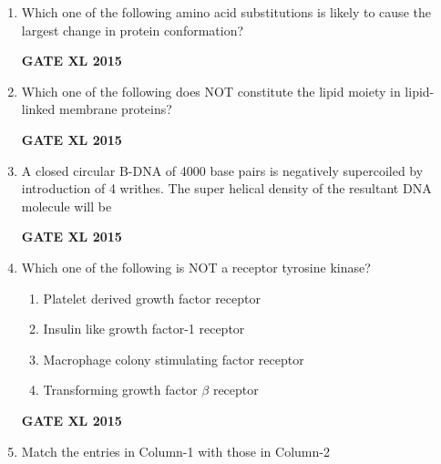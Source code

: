 \documentclass[journal,12pt,onecolumn]{IEEEtran}
\begin{document}
\begin{enumerate}
\begin{enumerate}
\begin{multicols}{4}
		    \end{multicols}
    \end{enumerate}
\begin{flushright}\textbf{GATE XL 2015}\end{flushright}
\item Which one of the following amino acid substitutions is likely to cause the largest change in protein conformation?
    \begin{enumerate}
    \end{enumerate}
\begin{flushright}\textbf{GATE XL 2015}\end{flushright}
\item Which one of the following does NOT constitute the lipid moiety in lipid-linked membrane proteins?
        \begin{enumerate} 
	\end{enumerate}
\begin{flushright}\textbf{GATE XL 2015}\end{flushright}
\item A closed circular B-DNA of 4000 base pairs is negatively supercoiled by introduction of 4 writhes. The super helical density of the resultant DNA molecule will be
\begin{flushright}\textbf{GATE XL 2015}\end{flushright}
\item Which one of the following is NOT a receptor tyrosine kinase?
    \begin{enumerate}
            \item Platelet derived growth factor receptor
	    \item Insulin like growth factor-1 receptor
	    \item Macrophage colony stimulating factor receptor
            \item Transforming growth factor $\beta$ receptor
    \end{enumerate}
\begin{flushright}\textbf{GATE XL 2015}\end{flushright}
\item Match the entries in Column-1 with those in Column-2



\end{enumerate}
\end{document}
